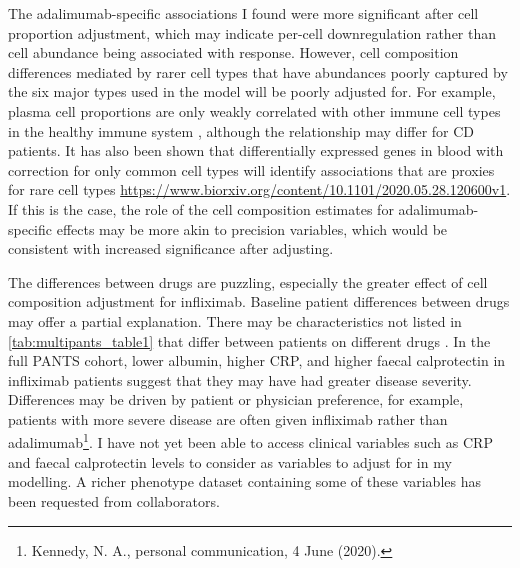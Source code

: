 The adalimumab-specific associations I found were more significant after cell proportion adjustment, 
which may indicate per-cell downregulation rather than cell abundance being associated with response.
However, cell composition differences mediated by rarer cell types that have abundances poorly captured by the six major types used in the model will be poorly adjusted for.
For example, plasma cell proportions are only weakly correlated with other immune cell types in the healthy immune system \autocite{zalocusky201810000Immunomes}, 
although the relationship may differ for \gls{CD} patients.
It has also been shown that differentially expressed genes in blood with correction for only common cell types will 
identify associations that are proxies for rare cell types \url{https://www.biorxiv.org/content/10.1101/2020.05.28.120600v1}.
If this is the case, the role of the cell composition estimates for adalimumab-specific effects may be more akin to precision variables, 
which would be consistent with increased significance after adjusting.

The differences between drugs are puzzling, especially the greater effect of cell composition adjustment for infliximab. 
Baseline patient differences between drugs may offer a partial explanation.
There may be characteristics not listed in \autoref{tab:multipants_table1} that differ between patients on different drugs \autocite{kennedy2019PredictorsAntiTNFTreatment}.
In the full \gls{PANTS} cohort, lower albumin, higher \gls{CRP}, and higher faecal calprotectin in infliximab patients suggest that they may have had greater disease severity.
Differences may be driven by patient or physician preference, for example, patients with more severe disease are often given infliximab rather than adalimumab\footnote{Kennedy, N. A., personal communication, 4 June (2020).}.
I have not yet been able to access clinical variables such as \gls{CRP} and faecal calprotectin levels to consider as variables to adjust for in my modelling.
A richer phenotype dataset containing some of these variables has been requested from collaborators.

